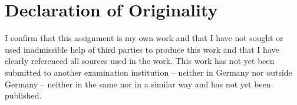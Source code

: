 \thispagestyle{empty}

\section*{Declaration of Originality}
I confirm that this assignment is my own work and that I have not sought or used inadmissible help of third parties to produce this work and that I have clearly referenced all sources used in the work.
\breakit
This work has not yet been submitted to another examination institution -- neither in Germany nor outside Germany -- neither in the same nor in a similar way and has not yet been published.

\vspace*{1.5cm}



\clearpage{\thispagestyle{empty}\cleardoublepage}
